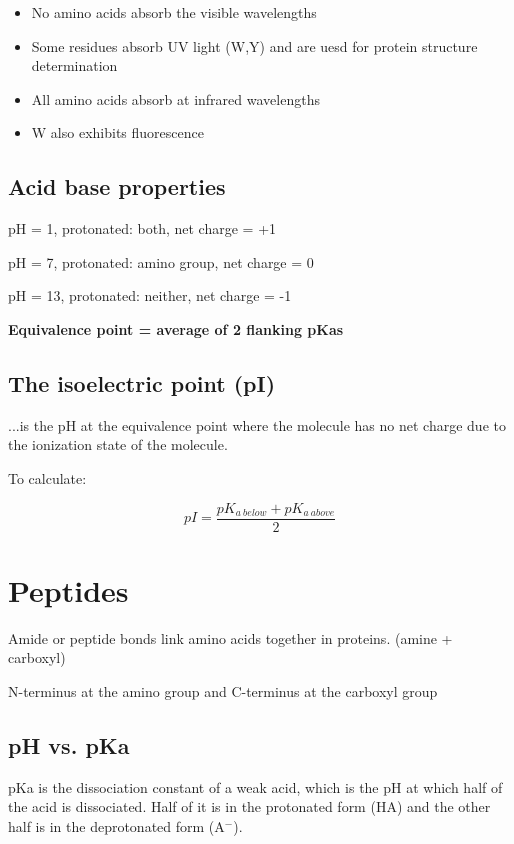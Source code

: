 \documentclass[letterpaper, 12pt]{article}
\begin{document}
\begin{itemize}
\item No amino acids absorb the visible wavelengths
\item Some residues absorb UV light (W,Y) and are uesd for protein structure determination
\item All amino acids absorb at infrared wavelengths
\item W also exhibits fluorescence
\end{itemize}

\subsection*{Acid base properties}

pH = 1, protonated: both, net charge = +1

pH = 7, protonated: amino group, net charge = 0

pH = 13, protonated: neither, net charge = -1

\textbf{Equivalence point = average of 2 flanking pKas}

\subsection*{The isoelectric point (pI)}
...is the pH at the equivalence point where the molecule has no net charge due to the ionization state of the molecule.

To calculate:

\begin{equation}
pI = \frac{pK_{a \: below} + pK_{a \: above}}{2}
\end{equation}

\newpage

\section*{Peptides}

Amide or peptide bonds link amino acids together in proteins. (amine + carboxyl)

N-terminus at the amino group and C-terminus at the carboxyl group

\subsection*{pH vs. pKa}

pKa is the dissociation constant of a weak acid, which is the pH at which half of the acid is dissociated. Half of it is in the protonated form (HA) and the other half is in the deprotonated form (A$^-$). 
\end{document}
